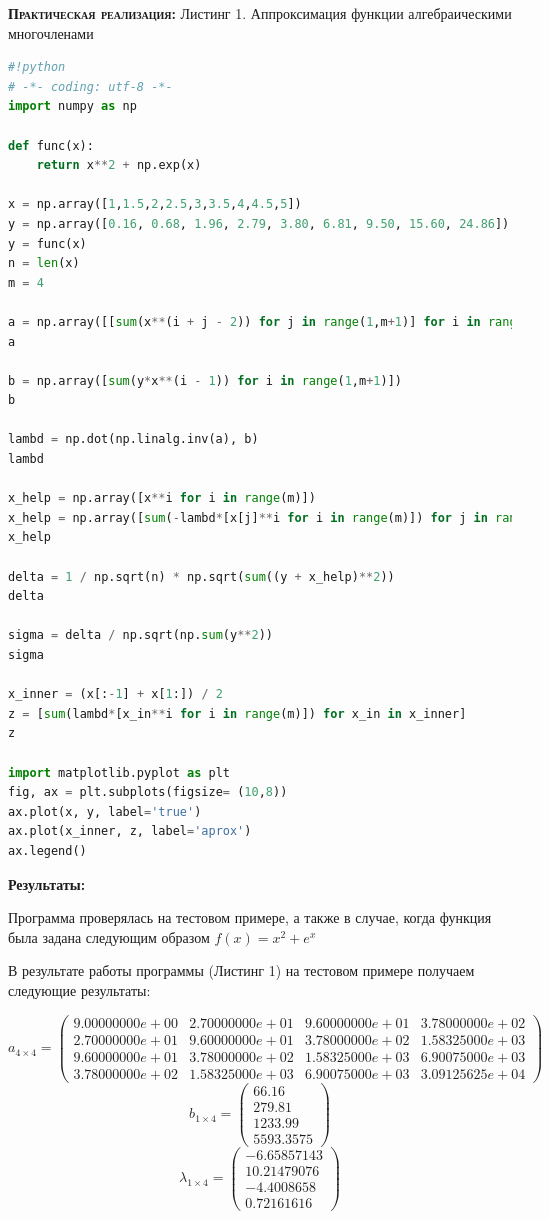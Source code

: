 \documentclass [12pt]{article}
\begin{document}
\textsc{\textbf{Практическая реализация:}}
Листинг 1. Аппроксимация функции алгебраическими многочленами
\begin{lstlisting}[language=python]
#!python
# -*- coding: utf-8 -*-
import numpy as np

def func(x):
    return x**2 + np.exp(x)

x = np.array([1,1.5,2,2.5,3,3.5,4,4.5,5])
y = np.array([0.16, 0.68, 1.96, 2.79, 3.80, 6.81, 9.50, 15.60, 24.86])
y = func(x)
n = len(x)
m = 4

a = np.array([[sum(x**(i + j - 2)) for j in range(1,m+1)] for i in range(1,m+1)])
a

b = np.array([sum(y*x**(i - 1)) for i in range(1,m+1)])
b

lambd = np.dot(np.linalg.inv(a), b)
lambd

x_help = np.array([x**i for i in range(m)])
x_help = np.array([sum(-lambd*[x[j]**i for i in range(m)]) for j in range(n)])
x_help

delta = 1 / np.sqrt(n) * np.sqrt(sum((y + x_help)**2))
delta

sigma = delta / np.sqrt(np.sum(y**2))
sigma

x_inner = (x[:-1] + x[1:]) / 2
z = [sum(lambd*[x_in**i for i in range(m)]) for x_in in x_inner]
z

import matplotlib.pyplot as plt
fig, ax = plt.subplots(figsize= (10,8))
ax.plot(x, y, label='true')
ax.plot(x_inner, z, label='aprox')
ax.legend()

\end{lstlisting}
\textbf{Результаты:}

Программа проверялась на тестовом примере, а также в случае, когда функция была задана следующим образом $ f(x) = x^2 + e{^x}$

В результате работы программы (Листинг 1) на тестовом примере получаем следующие результаты: 

\[
  a_{4\times 4} = 
  \begin{pmatrix}
    9.00000000e+00 & 2.70000000e+01 & 9.60000000e+01 & 3.78000000e+02\\
    2.70000000e+01 & 9.60000000e+01 & 3.78000000e+02 & 1.58325000e+03\\
    9.60000000e+01 & 3.78000000e+02 & 1.58325000e+03 & 6.90075000e+03\\
    3.78000000e+02 & 1.58325000e+03 & 6.90075000e+03 & 3.09125625e+04
  \end{pmatrix}
\]
\[
  b_{1\times 4} = 
  \begin{pmatrix}
    66.16 \\
    279.81 \\
    1233.99 \\
    5593.3575 
  \end{pmatrix}
\]
\[
  \lambda_{1\times 4} = 
  \begin{pmatrix}
    -6.65857143 \\
    10.21479076 \\
    -4.4008658 \\
    0.72161616 
  \end{pmatrix}
\]
\end{document}
